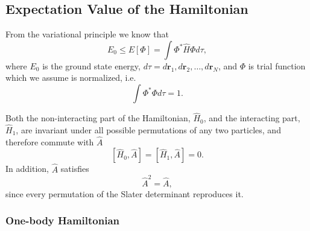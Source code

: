 \documentclass[../main.tex]{subfiles}
\begin{document}
\subsection{Expectation Value of the Hamiltonian}

From the variational principle we know that
\begin{equation}
    E_0 \leq E\left[ \Phi \right] = \int \Phi^* \hat{H} \Phi d\tau,
\end{equation}
where $E_0$ is the ground state energy, $d\tau = d\mathbf{r}_1,d\mathbf{r}_2,\dots,d\mathbf{r}_N$, and $\Phi$ is trial function which we assume is normalized, i.e.
\begin{equation}
    \int \Phi^* \Phi d\tau = 1.
\end{equation}

Both the non-interacting part of the Hamiltonian, $\hat{H}_0$, and the interacting part, $\hat{H}_1$, are invariant under all possible permutations of any two particles, and therefore commute with $\hat{A}$
\begin{equation}\label{eq:HA commute}
    \left[ \hat{H}_0, \hat{A} \right] = \left[ \hat{H}_1, \hat{A} \right] = 0.
\end{equation}
In addition, $\hat{A}$ satisfies 
\begin{equation}\label{eq:A2=A}
    \hat{A}^2 = \hat{A},
\end{equation}
since every permutation of the Slater determinant reproduces it. 

\subsubsection{One-body Hamiltonian}
\end{document}
